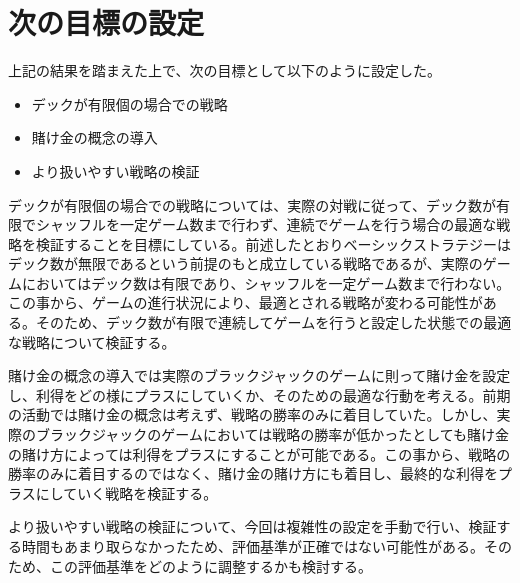 \section{次の目標の設定}

上記の結果を踏まえた上で、次の目標として以下のように設定した。

\begin{itemize}
\item デックが有限個の場合での戦略
\item 賭け金の概念の導入
\item より扱いやすい戦略の検証
\end{itemize}

デックが有限個の場合での戦略については、実際の対戦に従って、デック数が有限でシャッフルを一定ゲーム数まで行わず、連続でゲームを行う場合の最適な戦略を検証することを目標にしている。前述したとおりベーシックストラテジーはデック数が無限であるという前提のもと成立している戦略であるが、実際のゲームにおいてはデック数は有限であり、シャッフルを一定ゲーム数まで行わない。この事から、ゲームの進行状況により、最適とされる戦略が変わる可能性がある。そのため、デック数が有限で連続してゲームを行うと設定した状態での最適な戦略について検証する。

賭け金の概念の導入では実際のブラックジャックのゲームに則って賭け金を設定し、利得をどの様にプラスにしていくか、そのための最適な行動を考える。前期の活動では賭け金の概念は考えず、戦略の勝率のみに着目していた。しかし、実際のブラックジャックのゲームにおいては戦略の勝率が低かったとしても賭け金の賭け方によっては利得をプラスにすることが可能である。この事から、戦略の勝率のみに着目するのではなく、賭け金の賭け方にも着目し、最終的な利得をプラスにしていく戦略を検証する。

より扱いやすい戦略の検証について、今回は複雑性の設定を手動で行い、検証する時間もあまり取らなかったため、評価基準が正確ではない可能性がある。そのため、この評価基準をどのように調整するかも検討する。

